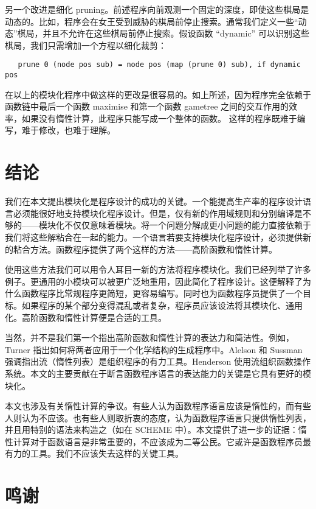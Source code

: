 \documentclass[12pt,a4paper]{article}
\begin{document}
另一个改进是细化 pruning。前述程序向前观测一个固定的深度，即使这些棋局是动态的。比如，程序会在女王受到威胁的棋局前停止搜索。通常我们定义一些``动态''棋局，并且不允许在这些棋局前停止搜索。假设函数 ``dynamic'' 可以识别这些棋局，我们只需增加一个方程以细化裁剪：

\begin{verbatim}
   prune 0 (node pos sub) = node pos (map (prune 0) sub), if dynamic pos
\end{verbatim}

在以上的模块化程序中做这样的更改是很容易的。如上所述，因为程序完全依赖于函数链中最后一个函数 maximise 和第一个函数 gametree 之间的交互作用的效率，如果没有惰性计算，此程序只能写成一个整体的函数。 这样的程序既难于编写，难于修改，也难于理解。

\section{结论}

我们在本文提出模块化是程序设计的成功的关键。一个能提高生产率的程序设计语言必须能很好地支持模块化程序设计。但是，仅有新的作用域规则和分别编译是不够的——模块化不仅仅意味着模块。将一个问题分解成更小问题的能力直接依赖于我们将这些解粘合在一起的能力。一个语言若要支持模块化程序设计，必须提供新的粘合方法。函数程序提供了两个这样的方法——高阶函数和惰性计算。

使用这些方法我们可以用令人耳目一新的方法将程序模块化。我们已经列举了许多例子。更通用的小模块可以被更广泛地重用，因此简化了程序设计。这便解释了为什么函数程序比常规程序更简短，更容易编写。同时也为函数程序员提供了一个目标。如果程序的某个部分变得混乱或者复杂，程序员应该设法将其模块化、通用化。高阶函数和惰性计算便是合适的工具。

当然，并不是我们第一个指出高阶函数和惰性计算的表达力和简洁性。例如，Turner 指出如何将两者应用于一个化学结构的生成程序中\cite[Tur81]{Tur81}。Alelson 和 Sussman 强调指出流（惰性列表）是组织程序的有力工具\cite[AS86]{AS86}。Henderson 使用流组织函数操作系统\cite[Hen82]{Hen82}。本文的主要贡献在于断言函数程序语言的表达能力的关键是它具有更好的模块化。

本文也涉及有关惰性计算的争议。有些人认为函数程序语言应该是惰性的，而有些人则认为不应该。也有些人则取折衷的态度，认为函数程序语言只提供惰性列表，并且用特别的语法来构造之（如在 SCHEME\cite[AS86]{AS86} 中）。本文提供了进一步的证据：惰性计算对于函数语言是非常重要的，不应该成为二等公民。它或许是函数程序员最有力的工具。我们不应该失去这样的关键工具。

\section{鸣谢}
\end{document}

